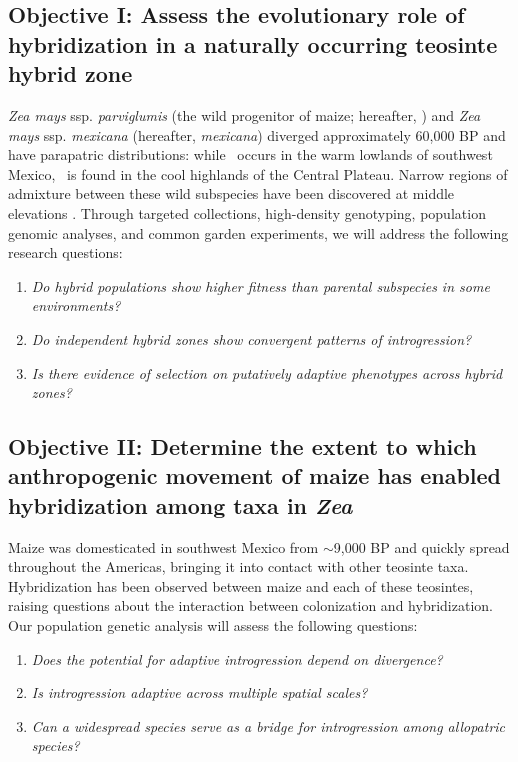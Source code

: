\subsection*{Objective I: Assess the evolutionary role of hybridization in a naturally occurring teosinte hybrid zone}
\emph{Zea mays} ssp. \emph{parviglumis} (the wild progenitor of maize; hereafter, \zp) and \emph{Zea mays} ssp. \emph{mexicana} (hereafter, \emph{mexicana}) diverged approximately 60,000 BP \citep{Ross-Ibarra2009a} and have parapatric distributions: while \zp\ occurs in the warm lowlands of southwest Mexico, \zm\  is found in the cool highlands of the Central Plateau. 
Narrow regions of admixture between these wild subspecies have been discovered at middle elevations \citep{Fukunaga2005, Pyhajarvi2013}. 
Through targeted collections, high-density genotyping, population genomic analyses, and common garden experiments, we will address the following research questions: 

\begin{enumerate}
\item \emph{Do hybrid populations show higher fitness than parental subspecies in some environments?}
\item \emph{Do independent hybrid zones show convergent patterns of introgression?}
\item \emph{Is there evidence of selection on putatively adaptive phenotypes across hybrid zones?}
\end{enumerate}

\subsection*{Objective II: Determine the extent to which anthropogenic movement of maize has enabled hybridization among taxa in \emph{Zea}}
Maize was domesticated in southwest Mexico from \zp{} $\sim$9,000 BP \citep{Matsuoka2002} and quickly spread throughout the Americas, bringing it into contact with other teosinte taxa.
Hybridization has been observed between maize and each of these teosintes, raising questions about the interaction between colonization and hybridization.
Our population genetic analysis will assess the following questions:
\begin{enumerate}
\item \emph{Does the potential for adaptive introgression depend on divergence?}
\item \emph{Is introgression adaptive across multiple spatial scales?}
\item \emph{Can a widespread species serve as a bridge for introgression among allopatric species?} 
\end{enumerate}

